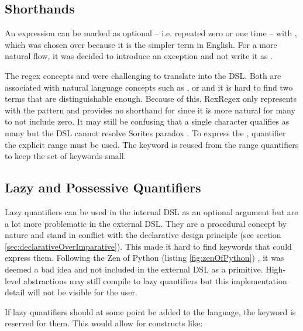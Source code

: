 \subsection{Shorthands}

An expression can be marked as optional -- i.e. repeated zero or one time -- with , which was chosen over  because it is the simpler term in English. For a more natural flow, it was decided to introduce an exception and not write it as .

The regex concepts \pattern{\placeholder *} and \pattern{\placeholder +} were challenging to translate into the DSL. Both are associated with natural language concepts such as ,  or  and it is hard to find two terms that are distinguishable enough. Because of this, RexRegex only represents \pattern{+} with the  pattern and provides no shorthand for \pattern{*} since it is more natural for many to not include zero. It may still be confusing that a single character qualifies as many but the DSL cannot resolve Sorites paradox \cite{SoritesParadox}. To express the \pattern{*}, quantifier the explicit range  must be used. The  keyword is reused from the range quantifiers to keep the set of keywords small.

\subsection{Lazy and Possessive Quantifiers}

Lazy quantifiers can be used in the internal DSL as an optional argument  but are a lot more problematic in the external DSL. They are a procedural concept by nature and stand in conflict with the declarative design principle (see section \ref{sec:declarativeOverImparative}). This made it hard to find keywords that could express them. Following the Zen of Python (listing \ref{fig:zenOfPython}) , it was deemed a bad idea and not included in the external DSL as a primitive. High-level abstractions may still compile to lazy quantifiers but this implementation detail will not be visible for the user.

If lazy quantifiers should at some point be added to the language, the  keyword is reserved for them. This would allow for constructs like: 

